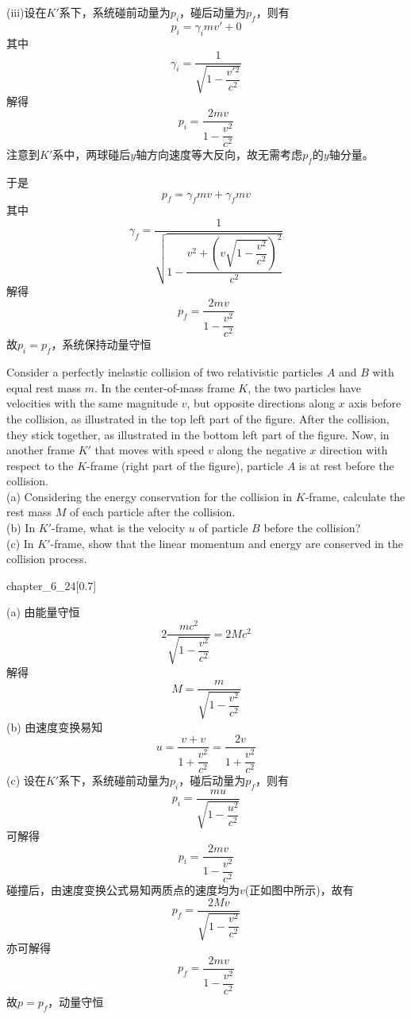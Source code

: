 \begin{solution}
    (iii)设在$K'$系下，系统碰前动量为$p_i$，碰后动量为$p_f$，则有
    \[p_i=\gamma_i mv'+0\]
    其中
    \[\gamma_i = \dfrac{1}{\sqrt{1-\dfrac{v'{}^2}{c^2}}}\]
    解得
    \[p_i=\dfrac{2mv}{1-\dfrac{v^2}{c^2}}\]
    注意到$K'$系中，两球碰后$y$轴方向速度等大反向，故无需考虑$p_f$的$y$轴分量。

    于是
    \[p_f=\gamma_f mv +\gamma_f mv\]
    其中
    \[\gamma_f=\dfrac{1}{\sqrt{1-\dfrac{v^2+\left(v\sqrt{1-\dfrac{v^2}{c^2}}\right)^2}{c^2}}}\]
    解得
    \[p_f=\dfrac{2mv}{1-\dfrac{v^2}{c^2}}\]
    故$p_i=p_f$，系统保持动量守恒

\end{solution}

\begin{solution}
    Consider a perfectly inelastic collision of two relativistic particles $A$ and $B$ with equal rest mass $m$. In the center-of-mass frame $K$, the two particles have velocities with the same magnitude $v$, but opposite directions along $x$ axis before the collision, as illustrated in the top left part of the figure. After the collision, they stick together, as illustrated in the bottom left part of the figure. Now, in another frame $K'$ that moves with speed $v$ along the negative $x$ direction with respect to the $K$-frame (right part of the figure), particle $A$ is at rest before the collision.
    \\(a) Considering the energy conservation for the collision in $K$-frame, calculate the
    rest mass $M$ of each particle after the collision.
    \\(b) In $K'$-frame, what is the velocity $u$ of particle $B$ before the collision?
    \\(c) In $K'$-frame, show that the linear momentum and energy are conserved in the collision process.
    \begin{singlefigure}{chapter_6_24}[0.7]
    \end{singlefigure}

    \tcbrule

    (a) 由能量守恒
    \[2\frac{mc^2}{\sqrt{1-\dfrac{v^2}{c^2}}}=2Mc^2\]
    解得\[
        M=\frac{m}{\sqrt{1-\dfrac{v^{2}}{c^{2}}}}
    \]
    (b) 由速度变换易知
    \[u=\frac{v+v}{1+\dfrac{v^{2}}{c^{2}}}=\frac{2v}{1+\dfrac{v^{2}}{c^{2}}}\]
    (c) 设在$K'$系下，系统碰前动量为$p_i$，碰后动量为$p_f$，则有
    \[p_i=\frac{mu}{\sqrt{1-\dfrac{u^{2}}{c^{2}}}}\]
    可解得
    \[p_i=\frac{2mv}{1-\dfrac{v^{2}}{c^{2}}}\]
    碰撞后，由速度变换公式易知两质点的速度均为$v$(正如图中所示)，故有
    \[p_f=\frac{2Mv}{\sqrt{1-\dfrac{v^{2}}{c^{2}}}}\]
    亦可解得
    \[p_f=\frac{2mv}{1-\dfrac{v^{2}}{c^{2}}}\]
    故$p=p_f$，动量守恒


\end{solution}
